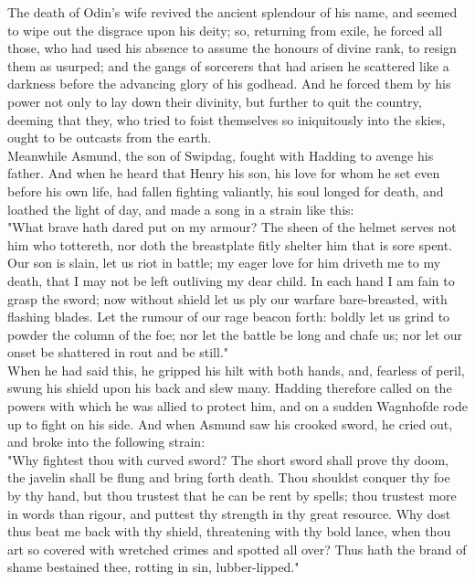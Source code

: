 \documentclass[10pt,a4paper]{report}
\begin{document}
The death of Odin's wife revived the ancient splendour of his name, and seemed to wipe out the disgrace upon his deity; so, returning from exile, he forced all those, who had used his absence to assume the honours of divine rank, to resign them as usurped; and the gangs of sorcerers that had arisen he scattered like a darkness before the advancing glory of his godhead. And he forced them by his power not only to lay down their divinity, but further to quit the country, deeming that they, who tried to foist themselves so iniquitously into the skies, ought to be outcasts from the earth.\\

Meanwhile Asmund, the son of Swipdag, fought with Hadding to avenge his father. And when he heard that Henry his son, his love for whom he set even before his own life, had fallen fighting valiantly, his soul longed for death, and loathed the light of day, and made a song in a strain like this:\\

"What brave hath dared put on my armour? The sheen of the helmet serves not him who tottereth, nor doth the breastplate fitly shelter him that is sore spent. Our son is slain, let us riot in battle; my eager love for him driveth me to my death, that I may not be left outliving my dear child. In each hand I am fain to grasp the sword; now without shield let us ply our warfare bare-breasted, with flashing blades. Let the rumour of our rage beacon forth: boldly let us grind to powder the column of the foe; nor let the battle be long and chafe us; nor let our onset be shattered in rout and be still."\\

When he had said this, he gripped his hilt with both hands, and, fearless of peril, swung his shield upon his back and slew many. Hadding therefore called on the powers with which he was allied to protect him, and on a sudden Wagnhofde rode up to fight on his side. And when Asmund saw his crooked sword, he cried out, and broke into the following strain:\\

"Why fightest thou with curved sword? The short sword shall prove thy doom, the javelin shall be flung and bring forth death. Thou shouldst conquer thy foe by thy hand, but thou trustest that he can be rent by spells; thou trustest more in words than rigour, and puttest thy strength in thy great resource. Why dost thus beat me back with thy shield, threatening with thy bold lance, when thou art so covered with wretched crimes and spotted all over? Thus hath the brand of shame bestained thee, rotting in sin, lubber-lipped."\\
\end{document}
